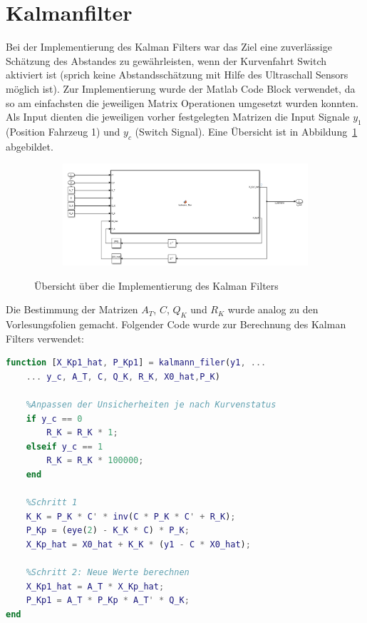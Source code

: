 \section{Kalmanfilter}\label{sec:kalmanfilter}
Bei der Implementierung des Kalman Filters war das Ziel eine zuverlässige
Schätzung des Abstandes zu gewährleisten, wenn der Kurvenfahrt Switch aktiviert
ist (sprich keine Abstandsschätzung mit Hilfe des Ultraschall Sensors möglich
ist). Zur Implementierung wurde der Matlab Code Block verwendet, da so am
einfachsten die jeweiligen Matrix Operationen umgesetzt wurden konnten. Als
Input dienten die jeweiligen vorher festgelegten Matrizen die Input Signale
$y_1$ (Position Fahrzeug 1) und $y_c$ (Switch Signal). Eine Übersicht ist in
Abbildung~\ref{fig:kalmanuebersicht} abgebildet.
\begin{figure}[hbt]
\centering
\begin{subfigure}{0.49\textwidth}
    \centering
    \includegraphics*[width=\textwidth]{figures/kalman_uebersicht.png}
\end{subfigure}

    \caption{Übersicht über die Implementierung des Kalman Filters
    \label{fig:kalmanuebersicht}}
\end{figure}    
Die Bestimmung der Matrizen $A_T$, $C$, $Q_K$ und $R_K$ wurde analog zu den
Vorlesungsfolien gemacht. Folgender Code wurde zur Berechnung des Kalman Filters
verwendet:
\begin{lstlisting}[language=matlab]
function [X_Kp1_hat, P_Kp1] = kalmann_filer(y1, ...
    ... y_c, A_T, C, Q_K, R_K, X0_hat,P_K)

    %Anpassen der Unsicherheiten je nach Kurvenstatus 
    if y_c == 0 
        R_K = R_K * 1;
    elseif y_c == 1
        R_K = R_K * 100000;
    end

    %Schritt 1
    K_K = P_K * C' * inv(C * P_K * C' + R_K);
    P_Kp = (eye(2) - K_K * C) * P_K;
    X_Kp_hat = X0_hat + K_K * (y1 - C * X0_hat);
    
    %Schritt 2: Neue Werte berechnen
    X_Kp1_hat = A_T * X_Kp_hat;
    P_Kp1 = A_T * P_Kp * A_T' * Q_K;
end
\end{lstlisting}
